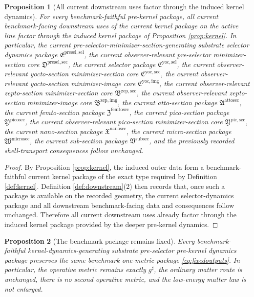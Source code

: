 \documentclass[11pt]{article}
\newcommand{\CompletedMetric}{g^{\sharp}}
\newcommand{\SubSectionPackage}{\mathfrak V^{\mathrm{subsec}}}
\newcommand{\MicroSectionPackage}{\mathfrak W^{\mathrm{microsec}}}
\newcommand{\NanoSectionPackage}{\mathfrak X^{\mathrm{nanosec}}}
\newcommand{\PicoSectionPackage}{\mathfrak Y^{\mathrm{picosec}}}
\newcommand{\PicoMinSectionCore}{\mathfrak Y^{\mathrm{pic,sec}}}
\newcommand{\FemtoSectionPackage}{\mathfrak Z^{\mathrm{femtosec}}}
\newcommand{\AttoSectionPackage}{\mathfrak A^{\mathrm{attosec}}}
\newcommand{\ZeptoImageCore}{\mathfrak B^{\mathrm{zep,img}}}
\newcommand{\ZeptoMinSectionCore}{\mathfrak B^{\mathrm{zep,sec}}}
\newcommand{\YoctoImageCore}{\mathfrak C^{\mathrm{yoc,img}}}
\newcommand{\YoctoMinSectionCore}{\mathfrak C^{\mathrm{yoc,sec}}}
\newcommand{\YoctoSelectorPackage}{\mathfrak C^{\mathrm{yoc,sel}}}
\newcommand{\PreSelectorMinSectionCore}{\mathfrak D^{\mathrm{presel,sec}}}
\newcommand{\PreSectionSelectorPackage}{\mathfrak E^{\mathrm{presel,sel}}}
\newtheorem{proposition}{Proposition}
\begin{document}
\begin{proposition}[All current downstream uses factor through the induced kernel dynamics]
\label{prop:downstream}
For every benchmark-faithful pre-kernel package, all current benchmark-facing downstream uses of the current kernel package on the active line factor through the induced kernel package of Proposition \ref{prop:kernel}. In particular, the current pre-selector-minimizer-section-generating substrate selector dynamics package \(\PreSectionSelectorPackage\), the current observer-relevant pre-selector minimizer-section core \(\PreSelectorMinSectionCore\), the current selector package \(\YoctoSelectorPackage\), the current observer-relevant yocto-section minimizer-section core \(\YoctoMinSectionCore\), the current observer-relevant yocto-section minimizer-image core \(\YoctoImageCore\), the current observer-relevant zepto-section minimizer-section core \(\ZeptoMinSectionCore\), the current observer-relevant zepto-section minimizer-image core \(\ZeptoImageCore\), the current atto-section package \(\AttoSectionPackage\), the current femto-section package \(\FemtoSectionPackage\), the current pico-section package \(\PicoSectionPackage\), the current observer-relevant pico-section minimizer-section core \(\PicoMinSectionCore\), the current nano-section package \(\NanoSectionPackage\), the current micro-section package \(\MicroSectionPackage\), the current sub-section package \(\SubSectionPackage\), and the previously recorded shell-transport consequences follow unchanged.
\end{proposition}

\begin{proof}
By Proposition \ref{prop:kernel}, the induced outer data form a benchmark-faithful current kernel package of the exact type required by Definition \ref{def:kernel}. Definition \ref{def:downstream}(2) then records that, once such a package is available on the recorded geometry, the current selector-dynamics package and all downstream benchmark-facing data and consequences follow unchanged. Therefore all current downstream uses already factor through the induced kernel package provided by the deeper pre-kernel dynamics.
\end{proof}

\begin{proposition}[The benchmark package remains fixed]
\label{prop:benchmark}
Every benchmark-faithful kernel-dynamics-generating substrate pre-selector pre-kernel dynamics package preserves the same benchmark one-metric package \eqref{eq:fixedoutputs}. In particular, the operative metric remains exactly \(\CompletedMetric\), the ordinary matter route is unchanged, there is no second operative metric, and the low-energy matter law is not enlarged.
\end{proposition}
\end{document}
